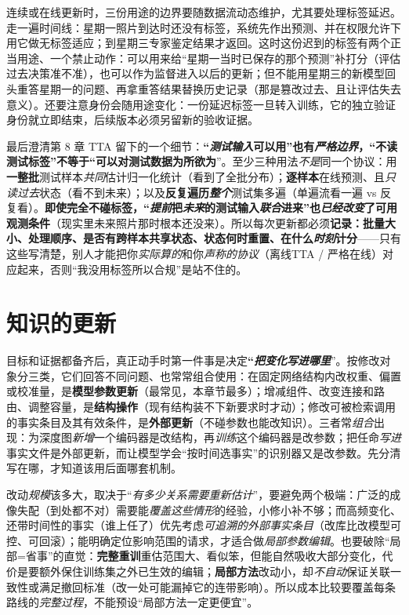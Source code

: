 连续或在线更新时，三份用途的边界要随数据流动态维护，尤其要处理标签延迟。走一遍时间线：星期一照片到达时还没有标签，系统先作出预测、并在权限允许下用它做无标签适应；到星期三专家鉴定结果才返回。这时这份迟到的标签有两个正当用途、一个禁止动作：可以用来给“星期一当时已保存的那个预测”补打分（评估过去决策准不准），也可以作为监督进入以后的更新；但不能用星期三的新模型回头重答星期一的问题、再拿重答结果替换历史记录（那是篡改过去、且让评估失去意义）。还要注意身份会随用途变化：一份延迟标签一旦转入训练，它的独立验证身份就立即结束，后续版本必须另留新的验收证据。

最后澄清第 8 章 TTA 留下的一个细节：\textbf{“\emph{测试输入}可以用”也有\emph{严格边界}，“不读测试标签”不等于“可以对测试数据为所欲为}”。至少三种用法\emph{不是}同一个协议：用\textbf{一整批}测试样本\emph{共同}估计归一化统计（看到了全批分布）；\textbf{逐样本}在线预测、且\emph{只读过去}状态（看不到未来）；以及\textbf{反复遍历\emph{整个}}测试集多遍（单遍流看一遍 vs 反复看）。\textbf{即使完全不碰标签，“\emph{提前}把\emph{未来}的测试输入\emph{联合}进来”也\emph{已经改变}了可用观测条件}（现实里未来照片那时根本还没来）。所以每次更新都必须\textbf{记录：批量大小、处理顺序、是否有跨样本共享状态、状态何时重置、在什么\emph{时刻}计分}——只有这些写清楚，别人才能把你\emph{实际算的}和你\emph{声称的协议}（离线TTA / 严格在线）对应起来，否则“我没用标签所以合规”是站不住的。

\section{知识的更新}
\label{sec:ket-update-operations}

目标和证据都备齐后，真正动手时第一件事是决定\textbf{“\emph{把变化写进哪里}}”。按修改对象分三类，它们回答不同问题、也常常组合使用：在固定网络结构内改权重、偏置或校准量，是\textbf{模型参数更新}（最常见，本章节最多）；增减组件、改变连接和路由、调整容量，是\textbf{结构操作}（现有结构装不下新要求时才动）；修改可被检索调用的事实条目及其有效条件，是\textbf{外部更新}（不碰参数也能改知识）。三者常\emph{组合}出现：为深度图\emph{新增}一个编码器是改结构，再\emph{训练}这个编码器是改参数；把任命\emph{写进}事实文件是外部更新，而让模型学会“按时间选事实”的识别器又是改参数。先分清写在哪，才知道该用后面哪套机制。

改动\emph{规模}该多大，取决于“\emph{有多少关系需要\emph{重新估计}}”，要避免两个极端：广泛的成像失配（到处都不对）需要能\emph{覆盖这些情形}的经验，小修小补不够；而高频变化、还带时间性的事实（谁上任了）优先考虑\emph{可追溯的外部事实条目}（改库比改模型可控、可回滚）；能明确定位影响范围的请求，才适合做\emph{局部参数编辑}。也要破除“局部=省事”的直觉：\textbf{完整重训}重估范围大、看似笨，但能自然吸收大部分变化，代价是要额外保住训练集之外已生效的编辑；\textbf{局部方法}改动小，却\emph{不自动}保证关联一致性或满足撤回标准（改一处可能漏掉它的连带影响）。所以成本比较要覆盖每条路线的\emph{完整过程}，不能预设“局部方法一定更便宜”。

